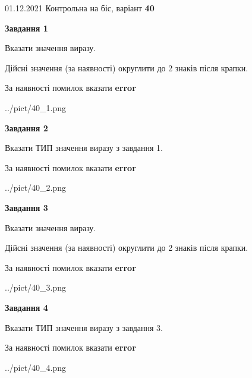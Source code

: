 \documentclass[11pt, ukrainian]{article}
\begin{document}
{01.12.2021 Контрольна на біс, варіант  \No \textbf { 40 }\par}
{
\begin {large}
{\begin {center}\textbf{Завдання 1}\end {center}}\par
Вказати значення виразу. \par
Дійсні значення (за наявності) округлити до 2 знаків після крапки. \par
За наявності помилок вказати \textbf{error}

\begin{center}
	{../pict/40_1.png}
\end{center}
\newpage

{\begin {center}\textbf{Завдання 2}\end {center}}\par
Вказати ТИП значення виразу з завдання 1. \par
За наявності помилок вказати \textbf{error}

\begin{center}
	{../pict/40_2.png}
\end{center}
\newpage

{\begin {center}\textbf{Завдання 3}\end {center}}\par
Вказати значення виразу. \par
Дійсні значення (за наявності) округлити до 2 знаків після крапки. \par
За наявності помилок вказати \textbf{error}

\begin{center}
	{../pict/40_3.png}
\end{center}
\newpage

{\begin {center}\textbf{Завдання 4}\end {center}}\par
Вказати ТИП значення виразу з завдання 3. \par
За наявності помилок вказати \textbf{error}

\begin{center}
	{../pict/40_4.png}
\end{center}
\newpage


\end{large}}
\end{document}
